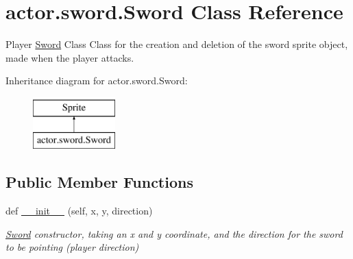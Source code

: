 \hypertarget{classactor_1_1sword_1_1_sword}{}\section{actor.\+sword.\+Sword Class Reference}
\label{classactor_1_1sword_1_1_sword}


Player \hyperlink{classactor_1_1sword_1_1_sword}{Sword} Class  Class for the creation and deletion of the sword sprite object, made when the player attacks.  


Inheritance diagram for actor.\+sword.\+Sword\+:\begin{figure}[H]
\begin{center}
\leavevmode
\includegraphics[height=2.000000cm]{classactor_1_1sword_1_1_sword}
\end{center}
\end{figure}
\subsection*{Public Member Functions}
\begin{DoxyCompactItemize}
\item 
def \hyperlink{classactor_1_1sword_1_1_sword_a311383f1e990c512b78b02c1b28cd7ea}{\+\_\+\+\_\+init\+\_\+\+\_\+} (self, x, y, direction)
\begin{DoxyCompactList}\small\item\em \hyperlink{classactor_1_1sword_1_1_sword}{Sword} constructor, taking an x and y coordinate, and the direction for the sword to be pointing (player direction) \end{DoxyCompactList}\end{DoxyCompactItemize}
